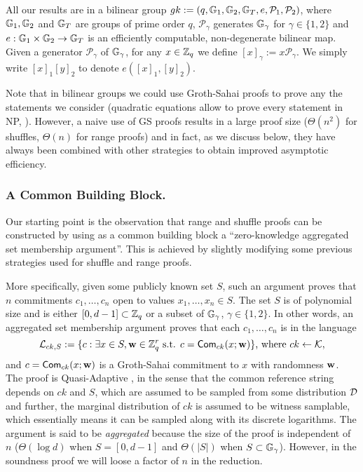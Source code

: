 All our results are in a bilinear group $gk:=(q,\mathbb{G}_1,\mathbb{G}_2,\mathbb{G}_T,e,\mathcal{P}_1,\mathcal{P}_2)$, where $\mathbb{G}_1,\mathbb{G}_2$
and $\mathbb{G}_T$ are groups of prime order $q$, $\mathcal{P}_\gamma$ generates  
$\mathbb{G}_\gamma$ for $\gamma \in \{1,2\}$ and $e:\mathbb{G}_1\times\mathbb{G}_2\to\mathbb{G}_T$ is an efficiently
computable, non-degenerate bilinear map. Given a generator $\mathcal{P}_\gamma$ of $\mathbb{G}_\gamma$, for any $x\in\mathbb{Z}_q$ we define $[x]_\gamma:=x\mathcal{P}_\gamma$. We simply write $[x]_1[y]_2$ to denote $e([x]_1,[y]_2)$.

Note that in bilinear groups we could use Groth-Sahai proofs to prove any the statements we consider (quadratic equations allow to prove every statement in NP, \cite{EC:GroOstSah06}).  However, a  naive use of GS proofs results in a large proof size ($\Theta(n^2)$ for shuffles, $\Theta(n)$ for range proofs) and in fact, as we discuss below, they have always been combined with other strategies to obtain improved asymptotic efficiency. 

\subsubsection{A Common Building Block.} Our starting point is the observation that range and shuffle proofs can be constructed by using as a common building block a 
``zero-knowledge aggregated set membership argument''. This is achieved by slightly modifying some previous strategies used for shuffle and range proofs.

More specifically,  given some publicly known set $S$, such an argument proves that $n$ commitments $c_1,\ldots,c_n$ open to values $x_1,\ldots,x_n \in S$.  The set $S$ is of polynomial size and is either $[0,d-1]\subset\mathbb{Z}_q$ or a subset of $\mathbb{G}_\gamma$, $\gamma \in \{1,2\}$.  
In other words, an aggregated set membership argument proves that each $c_1,\ldots,c_n$ is in the language
$$
\mathcal{L}_{ck,S}:=\{c: \exists x\in S, \mathbf{w}\in\mathbb{Z}_q^r \text{ s.t. } c=\mathsf{Com}_{ck}(x;\mathbf{w})\}\text{, where }ck\gets\mathcal{K},
$$
and $c=\mathsf{Com}_{ck}(x;\mathbf{w})$ is a Groth-Sahai commitment to $x$ with randomness $\mathbf{w}$. The proof is Quasi-Adaptive \cite{AC:JutRoy13}, in the sense that the common reference string depends on $ck$ and $S$, which are assumed to be sampled from some distribution $\mathcal{D}$
and further, the marginal distribution of $ck$ is assumed to be witness samplable, which essentially means it can be sampled along with its discrete logarithms. The argument is said to be \textit{aggregated} because the size of the proof is independent of $n$ ($\Theta(\log d)$ when $S=[0,d-1]$ and $\Theta(|S|)$ when $S\subset\mathbb{G}_\gamma$). However, in the soundness proof we will loose a factor of $n$ in the reduction. 

